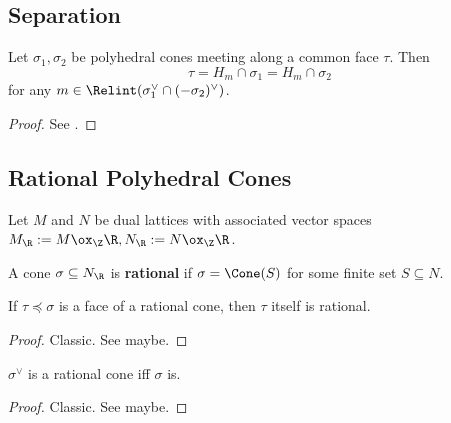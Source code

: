 \subsection{Separation}


\begin{lemma}
  \label{1-2-13-separation-lemma}

  Let $\sigma_1, \sigma_2$ be polyhedral cones meeting along a common face $\tau$. Then
  $$\tau = H_m \cap \sigma_1 = H_m \cap \sigma_2$$
  for any $m \in \Relint(\sigma_1^\vee \cap (-\sigma_2)^\vee)$.
\end{lemma}
\begin{proof}

  See \cite{Cox_2011}.
\end{proof}


\subsection{Rational Polyhedral Cones}


Let $M$ and $N$ be dual lattices with associated vector spaces $M_\R := M \ox_\Z \R, N_\R := N \ox_\Z \R$.


\begin{definition}
  \label{1-2-14-rat-cone}

  A cone $\sigma \subseteq N_\R$ is {\bf rational} if $\sigma = \Cone(S)$ for some finite set $S \subseteq N$.
\end{definition}


\begin{lemma}
  \label{1-2-14-face-rat-cone}

  If $\tau \preceq \sigma$ is a face of a rational cone, then $\tau$ itself is rational.
\end{lemma}
\begin{proof}
  \uses{}

  Classic. See \cite{Oda_1988} maybe.
\end{proof}


\begin{lemma}
  \label{1-2-14-dual-rat-cone}

  $\sigma^\vee$ is a rational cone iff $\sigma$ is.
\end{lemma}
\begin{proof}
  \uses{}

  Classic. See \cite{Oda_1988} maybe.
\end{proof}



